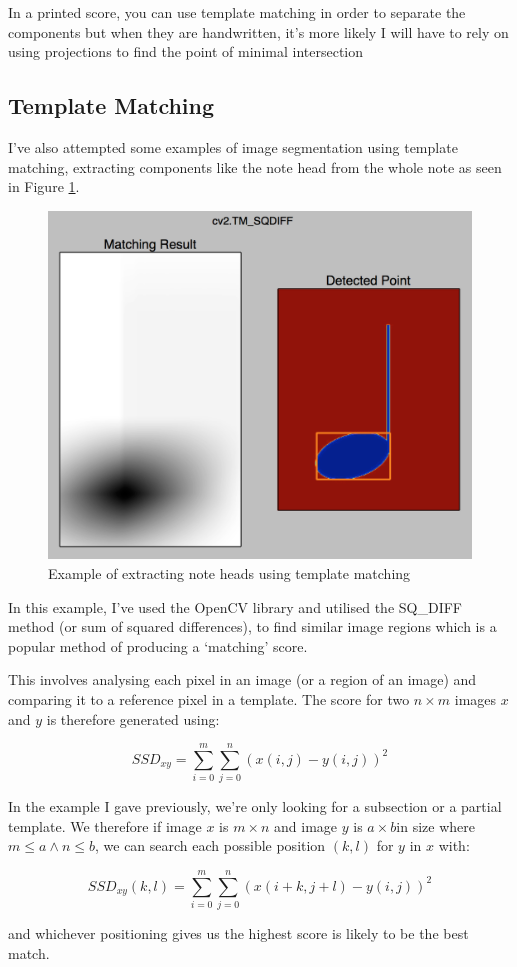 
In a printed score, you can use  template matching in order to separate the components but when they are handwritten, it's more likely I will have to rely on using projections to find the point of minimal intersection 

\subsection{Template Matching}

I've also attempted some examples of image segmentation using template matching, extracting components like the note head from the whole note as seen in Figure \ref{fig:templatematch}.

\begin{figure}[h!]
  \includegraphics[width=0.6\linewidth]{gfx/template.png}
  \centering
  \caption{Example of extracting note heads using template matching}
  \label{fig:templatematch}
\end{figure}

In this example, I've used the OpenCV library and utilised the SQ\_DIFF method (or sum of squared differences), to find similar image regions which is a popular method of producing a `matching' score.

This involves analysing each pixel in an image (or a region of an image) and comparing it to a reference pixel in a template. The score for two $n \times m$ images $x$ and $y$ is therefore generated using:

$$SSD_{xy} = \sum_{i = 0}^m \sum_{j = 0}^n (x(i, j) - y(i, j))^2$$

In the example I gave previously, we're only looking for a subsection or a partial template. We therefore if image $x$ is $m \times n$ and image $y$ is $a \times b$in size where $m \le a \land n \le b$, we can search each possible position $(k, l)$ for $y$ in $x$ with:

$$SSD_{xy}(k, l) = \sum_{i = 0}^m \sum_{j = 0}^n (x(i + k, j + l) - y(i, j))^2$$

and whichever positioning gives us the highest score is likely to be the best match.



